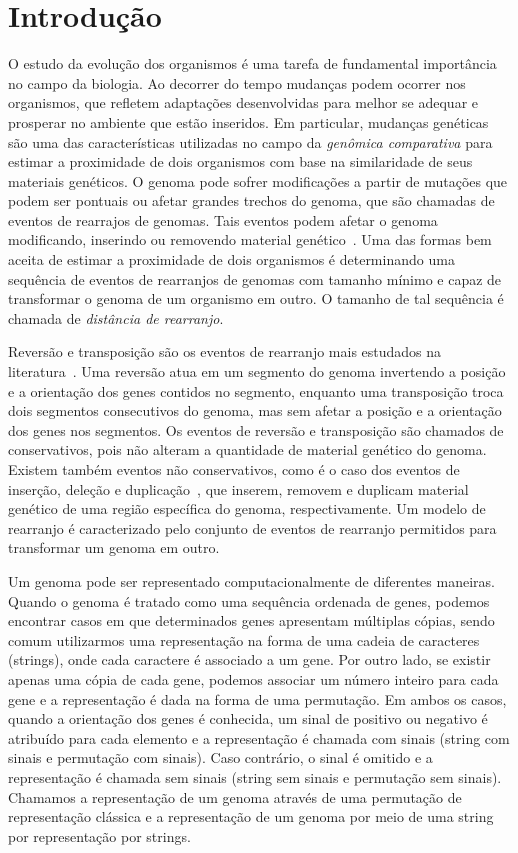 \chapter{Introdução}\label{chapter:XDSEJBWV}

O estudo da evolução dos organismos é uma tarefa de fundamental importância no campo da biologia. Ao decorrer do tempo mudanças podem ocorrer nos organismos, que refletem adaptações desenvolvidas para melhor se adequar e prosperar no ambiente que estão inseridos. Em particular, mudanças genéticas são uma das características utilizadas no campo da \emph{genômica comparativa} para estimar a proximidade de dois organismos com base na similaridade de seus materiais genéticos. O genoma pode sofrer modificações a partir de mutações que podem ser pontuais ou afetar grandes trechos do genoma, que são chamadas de eventos de rearrajos de genomas. Tais eventos podem afetar o genoma modificando, inserindo ou removendo material genético~\cite{2009-fertin-etal}. Uma das formas bem aceita de estimar a proximidade de dois organismos é determinando uma sequência de eventos de rearranjos de genomas com tamanho mínimo e capaz de transformar o genoma de um organismo em outro. O tamanho de tal sequência é chamada de \emph{distância de rearranjo}.

Reversão e transposição são os eventos de rearranjo mais estudados na literatura~\cite{1999-hannenhalli-pevzner,1999-caprara,2012-bulteau-etal,2019b-oliveira-etal}. Uma reversão atua em um segmento do genoma invertendo a posição e a orientação dos genes contidos no segmento, enquanto uma transposição troca dois segmentos consecutivos do genoma, mas sem afetar a posição e a orientação dos genes nos segmentos. Os eventos de reversão e transposição são chamados de conservativos, pois não alteram a quantidade de material genético do genoma. Existem também eventos não conservativos, como é o caso dos eventos de inserção, deleção e duplicação~\cite{2013-willing-etal,2012-elmabrouk-sankoff,2008-kahn-raphael,2020-mane-etal,2009-bader}, que inserem, removem e duplicam material genético de uma região específica do genoma, respectivamente. Um modelo de rearranjo é caracterizado pelo conjunto de eventos de rearranjo permitidos para transformar um genoma em outro.

Um genoma pode ser representado computacionalmente de diferentes maneiras. Quan\-do o genoma é tratado como uma sequência ordenada de genes, podemos encontrar casos em que determinados genes apresentam múltiplas cópias, sendo comum utilizarmos uma representação na forma de uma cadeia de caracteres (strings), onde cada caractere é associado a um gene. Por outro lado, se existir apenas uma cópia de cada gene, podemos associar um número inteiro para cada gene e a representação é dada na forma de uma permutação. Em ambos os casos, quando a orientação dos genes é conhecida, um sinal de positivo ou negativo é atribuído para cada elemento e a representação é chamada com sinais (string com sinais e permutação com sinais). Caso contrário, o sinal é omitido e a representação é chamada sem sinais (string sem sinais e permutação sem sinais). Chamamos a representação de um genoma através de uma permutação de representação clássica e a representação de um genoma por meio de uma string por representação por strings.

